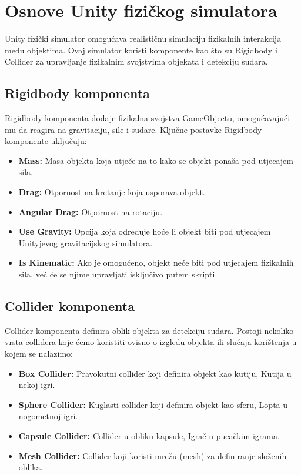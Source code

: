 \documentclass[diplomskirad]{fer}
\begin{document}
    \section{Osnove Unity fizičkog simulatora}\label{sec:osnove-unity-fizickog-simulatora}

    Unity fizički simulator omogućava realističnu simulaciju fizikalnih interakcija među objektima.
    Ovaj simulator koristi komponente kao što su Rigidbody i Collider za upravljanje fizikalnim svojstvima objekata i detekciju sudara.

    \subsection{Rigidbody komponenta}\label{subsec:rigidbody-komponenta}
    Rigidbody komponenta dodaje fizikalna svojstva GameObjectu, omogućavajući mu da reagira na gravitaciju, sile i sudare.
    Ključne postavke Rigidbody komponente uključuju:
    \begin{itemize}
        \item \textbf{Mass:} Masa objekta koja utječe na to kako se objekt ponaša pod utjecajem sila.
        \item \textbf{Drag:} Otpornost na kretanje koja usporava objekt.
        \item \textbf{Angular Drag:} Otpornost na rotaciju.
        \item \textbf{Use Gravity:} Opcija koja određuje hoće li objekt biti pod utjecajem Unityjevog gravitacijskog simulatora.
        \item \textbf{Is Kinematic:} Ako je omogućeno, objekt neće biti pod utjecajem fizikalnih sila, već će se njime upravljati isključivo putem skripti.
    \end{itemize}

    \subsection{Collider komponenta}\label{subsec:collider-komponenta}
    Collider komponenta definira oblik objekta za detekciju sudara.
    Postoji nekoliko vrsta collidera koje ćemo koristiti ovisno o izgledu objekta ili slučaja korištenja u kojem se nalazimo:
    \begin{itemize}
        \item \textbf{Box Collider:} Pravokutni collider koji definira objekt kao kutiju, Kutija u nekoj igri.
        \item \textbf{Sphere Collider:} Kuglasti collider koji definira objekt kao sferu, Lopta u nogometnoj igri.
        \item \textbf{Capsule Collider:} Collider u obliku kapsule, Igrač u pucačkim igrama.
        \item \textbf{Mesh Collider:} Collider koji koristi mrežu (mesh) za definiranje složenih oblika.
    \end{itemize}
\end{document}
